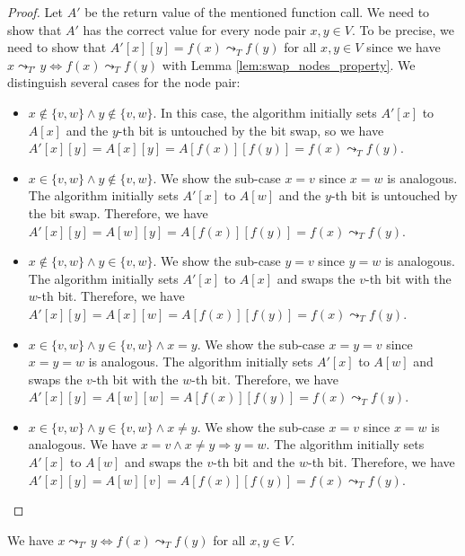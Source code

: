 \begin{proof}
    Let $A'$ be the return value of the mentioned function call. We need to show that $A'$ has the correct value for every node pair $x, y \in V$. To be precise, we need to show that $A'[x][y] = f(x) \leadsto_T f(y)$ for all $x, y \in V$ since we have $x \leadsto_{T'} y \Leftrightarrow f(x) \leadsto_T f(y)$ with Lemma \ref{lem:swap_nodes_property}. We distinguish several cases for the node pair:
    \begin{itemize}
        \item $x \notin \{v, w\} \wedge y \notin \{v, w\}$. In this case, the algorithm initially sets $A'[x]$ to $A[x]$ and the $y$-th bit is untouched by the bit swap, so we have $A'[x][y] = A[x][y] = A[f(x)][f(y)] = f(x) \leadsto_T f(y)$.
        
        \item $x \in \{v, w\} \wedge y \notin \{v, w\}$. We show the sub-case $x = v$ since $x = w$ is analogous. The algorithm initially sets $A'[x]$ to $A[w]$ and the $y$-th bit is untouched by the bit swap. Therefore, we have $A'[x][y] = A[w][y] = A[f(x)][f(y)] = f(x) \leadsto_T f(y)$.
        
        \item $x \notin \{v, w\} \wedge y \in \{v, w\}$. We show the sub-case $y = v$ since $y = w$ is analogous. The algorithm initially sets $A'[x]$ to $A[x]$ and swaps the $v$-th bit with the $w$-th bit. Therefore, we have $A'[x][y] = A[x][w] = A[f(x)][f(y)] = f(x) \leadsto_T f(y)$.
        
        \item $x \in \{v, w\} \wedge y \in \{v, w\} \wedge x = y$. We show the sub-case $x = y = v$ since $x = y = w$ is analogous. The algorithm initially sets $A'[x]$ to $A[w]$ and swaps the $v$-th bit with the $w$-th bit. Therefore, we have $A'[x][y] = A[w][w] = A[f(x)][f(y)] = f(x) \leadsto_T f(y)$.
        
        \item $x \in \{v, w\} \wedge y \in \{v, w\} \wedge x \neq y$. We show the sub-case $x = v$ since $x = w$ is analogous. We have $x = v \wedge x \neq y \Rightarrow y = w$. The algorithm initially sets $A'[x]$ to $A[w]$ and swaps the $v$-th bit and the $w$-th bit. Therefore, we have $A'[x][y] = A[w][v] = A[f(x)][f(y)] = f(x) \leadsto_T f(y)$.
    \end{itemize}
\end{proof}

\begin{lemma}
    \label{lem:swap_nodes_property}
    We have $x \leadsto_{T'} y \Leftrightarrow f(x) \leadsto_T f(y)$ for all $x, y \in V$.
\end{lemma}

